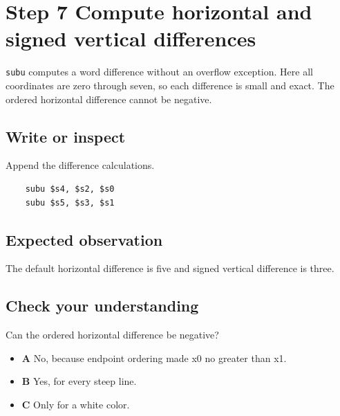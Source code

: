 \section{Step 7 Compute horizontal and signed vertical
  differences}\label{007-bresenham-line-s07-step-7-compute-horizontal-and-signed-vertical-differences}

\texttt{subu} computes a word difference without an overflow exception.
Here all coordinates are zero through seven, so each difference is small
and exact. The ordered horizontal difference cannot be negative.

\subsection{Write or
  inspect}\label{007-bresenham-line-s07-write-or-inspect}

Append the difference calculations.

\begin{verbatim}
    subu $s4, $s2, $s0
    subu $s5, $s3, $s1
\end{verbatim}

\subsection{Expected
  observation}\label{007-bresenham-line-s07-expected-observation}

The default horizontal difference is five and signed vertical difference
is three.

\subsection{Check your
  understanding}\label{007-bresenham-line-s07-check-your-understanding}

Can the ordered horizontal difference be negative?

\begin{itemize}
  \tightlist
  \item
        \textbf{A} No, because endpoint ordering made x0 no greater than x1.
  \item
        \textbf{B} Yes, for every steep line.
  \item
        \textbf{C} Only for a white color.
\end{itemize}
